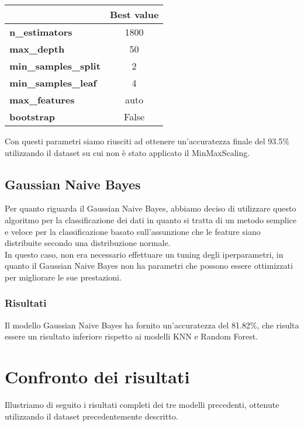 \documentclass[../../Report.tex]{subfiles}
\begin{document}
\begin{table}[H]
    \centering
    \begin{tabular}{|l|c|}
        \hline
        & \textbf{Best value} \\
        \hline
        \textbf{n\_estimators} & 1800 \\
        \hline
        \textbf{max\_depth} & 50 \\
        \hline
        \textbf{min\_samples\_split} & 2 \\
        \hline
        \textbf{min\_samples\_leaf} & 4 \\
        \hline
        \textbf{max\_features} & auto \\
        \hline
        \textbf{bootstrap} & False \\
        \hline
    \end{tabular}
\end{table}

Con questi parametri siamo riusciti ad ottenere un'accuratezza finale del 93.5\% utilizzando il dataset su cui non è stato applicato il MinMaxScaling.

\subsection{Gaussian Naive Bayes}
Per quanto riguarda il Gaussian Naive Bayes, abbiamo deciso di utilizzare questo algoritmo per la classificazione dei dati in quanto si tratta di un metodo semplice e veloce per la classificazione basato sull'assunzione che le feature siano distribuite secondo una distribuzione normale.\\
In questo caso, non era necessario effettuare un tuning degli iperparametri, in quanto il Gaussian Naive Bayes non ha parametri che possono essere ottimizzati per migliorare le sue prestazioni.

\subsubsection{Risultati}
Il modello Gaussian Naive Bayes ha fornito un'accuratezza del 81.82\%, che risulta essere un risultato inferiore rispetto ai modelli KNN e Random Forest.

\section{Confronto dei risultati}
Illustriamo di seguito i risultati completi dei tre modelli precedenti, ottenute utilizzando il dataset precedentemente descritto.
\end{document}
